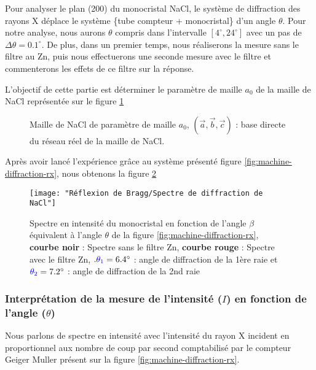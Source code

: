 Pour analyser le plan (200) du monocristal NaCl, le système de diffraction des rayons X déplace le système \{tube compteur + monocristal\} d'un angle $\theta$. Pour notre analyse, nous aurons $\theta$ compris dans l'intervalle $[4^\circ, 24^\circ]$ avec un pas de $\Delta \theta = 0.1^\circ$. De plus, dans un premier temps, nous réaliserons la mesure sans le filtre au Zn, puis nous effectuerons une seconde mesure avec le filtre et commenterons les effets de ce filtre sur la réponse.












\newpage

L'objectif de cette partie est déterminer le paramètre de maille $a_0$ de la maille de NaCl représentée sur le figure \ref{fig:cristalnacl}
\begin{figure}[h!]
	\centering
	
	\caption{\centering Maille de NaCl de paramètre de maille $a_0$, $\left(\vec{a}, \vec{b}, \vec{c}\right)$ : base directe du réseau réel de la maille de NaCl.}
	\label{fig:cristalnacl}
\end{figure}







Après avoir lancé l'expérience grâce au système présenté figure \ref{fig:machine-diffraction-rx}, nous obtenons la figure \ref{fig:spectre-de-diffraction-de-nacl}





\begin{figure}[h!]
	\centering
	\texttt{[image: "Réflexion de Bragg/Spectre de diffraction de NaCl"]}
	\caption{\centering Spectre en intensité du monocristal en fonction de l'angle $\beta$ équivalent à l'angle $\theta$ de la figure \ref{fig:machine-diffraction-rx}, \textbf{courbe noir} : Spectre sans le filtre Zn, {\color{red}\textbf{courbe rouge}} : Spectre avec le filtre Zn, $ .{\color{blue} \theta_1} = 6.4^\circ$ : angle de diffraction de la 1ère raie et $ {\color{blue} \theta_2}=7.2^\circ$ : angle de diffraction de la 2nd raie  }
	\label{fig:spectre-de-diffraction-de-nacl}
\end{figure}



	
\subsubsection{Interprétation de la mesure de l’intensité ($I$) en fonction de l’angle ($\theta$)}
Nous parlons de spectre en intensité avec l'intensité du rayon X incident en proportionnel aux nombre de coup par second comptabilisé par le compteur Geiger Muller présent sur la figure \ref{fig:machine-diffraction-rx}.
	
